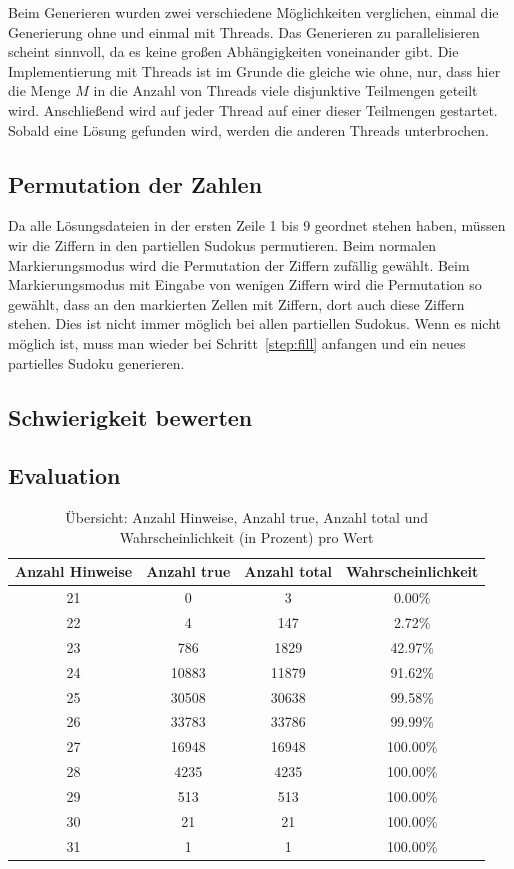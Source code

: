 Beim Generieren wurden zwei verschiedene Möglichkeiten verglichen, einmal die Generierung ohne und einmal mit Threads.
Das Generieren zu parallelisieren scheint sinnvoll, da es keine großen Abhängigkeiten voneinander gibt.
Die Implementierung mit Threads ist im Grunde die gleiche wie ohne, nur, dass hier die Menge $M$ in die Anzahl von Threads viele disjunktive Teilmengen geteilt wird.
Anschließend wird auf jeder Thread auf einer dieser Teilmengen gestartet. Sobald eine Lösung gefunden wird, werden die anderen Threads unterbrochen.

\subsection{Permutation der Zahlen}
Da alle Lösungsdateien in der ersten Zeile 1 bis 9 geordnet stehen haben, müssen wir die Ziffern in den partiellen Sudokus permutieren.
Beim normalen Markierungsmodus wird die Permutation der Ziffern zufällig gewählt.
Beim Markierungsmodus mit Eingabe von wenigen Ziffern wird die Permutation so gewählt, dass an den markierten Zellen mit Ziffern,
dort auch diese Ziffern stehen.
Dies ist nicht immer möglich bei allen partiellen Sudokus.
Wenn es nicht möglich ist, muss man wieder bei Schritt~\ref{step:fill} anfangen und ein neues partielles Sudoku generieren.


\subsection{Schwierigkeit bewerten}

\subsection{Evaluation}
\begin{table}[h!]
    \centering
    \begin{tabular}{|c|c|c|c|}
        \hline
        \textbf{Anzahl Hinweise} & \textbf{Anzahl true} & \textbf{Anzahl total} & \textbf{Wahrscheinlichkeit} \\
        \hline
        21 & 0     & 3     & 0.00\% \\
        22 & 4     & 147   & 2.72\% \\
        23 & 786   & 1829  & 42.97\% \\
        24 & 10883 & 11879 & 91.62\% \\
        25 & 30508 & 30638 & 99.58\% \\
        26 & 33783 & 33786 & 99.99\% \\
        27 & 16948 & 16948 & 100.00\% \\
        28 & 4235  & 4235  & 100.00\% \\
        29 & 513   & 513   & 100.00\% \\
        30 & 21    & 21    & 100.00\% \\
        31 & 1     & 1     & 100.00\% \\
        \hline
    \end{tabular}
    \caption{Übersicht: Anzahl Hinweise, Anzahl true, Anzahl total und Wahrscheinlichkeit (in Prozent) pro Wert}
\end{table}

